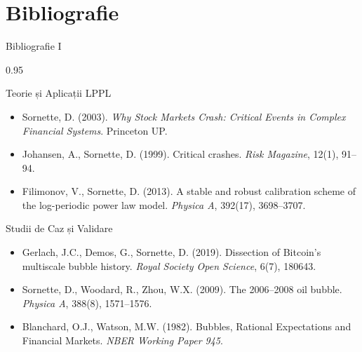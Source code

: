 \documentclass[9pt, aspectratio=169, t]{beamer}
\begin{document}
\section{Bibliografie}

\begin{frame}{Bibliografie I}
    \begin{cminipage}{0.95\textwidth}
    \begin{block}{Teorie și Aplicații LPPL}
        {\small
        \begin{itemize}\setlength{\itemsep}{0pt}
            \item Sornette, D. (2003). \textit{Why Stock Markets Crash: Critical Events in Complex Financial Systems}. Princeton UP.
            \item Johansen, A., Sornette, D. (1999). Critical crashes. \textit{Risk Magazine}, 12(1), 91--94.
            \item Filimonov, V., Sornette, D. (2013). A stable and robust calibration scheme of the log-periodic power law model. \textit{Physica A}, 392(17), 3698--3707.
        \end{itemize}
        }
    \end{block}

    \begin{exampleblock}{Studii de Caz și Validare}
        {\small
        \begin{itemize}\setlength{\itemsep}{0pt}
            \item Gerlach, J.C., Demos, G., Sornette, D. (2019). Dissection of Bitcoin's multiscale bubble history. \textit{Royal Society Open Science}, 6(7), 180643.
            \item Sornette, D., Woodard, R., Zhou, W.X. (2009). The 2006--2008 oil bubble. \textit{Physica A}, 388(8), 1571--1576.
            \item Blanchard, O.J., Watson, M.W. (1982). Bubbles, Rational Expectations and Financial Markets. \textit{NBER Working Paper 945}.
        \end{itemize}
        }
    \end{exampleblock}
    \end{cminipage}
\end{frame}
\end{document}
